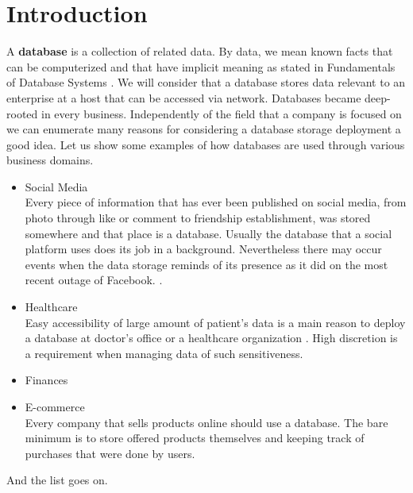 \chapter{Introduction}

\par 
A \textbf{database} is a collection of related data. By data, we mean known facts that can be computerized and that have implicit meaning as stated in Fundamentals of Database Systems \cite{ElmasryNavathe15}. We will consider that a database stores data relevant to an enterprise at a host that can be accessed via network.
Databases became deep-rooted in every business. 
Independently of the field that a company is focused on we can enumerate many reasons for considering a database storage deployment a good idea.
Let us show some examples of how databases are used through various business domains.

\begin{itemize}
	
	\item Social Media \\
	Every piece of information that has ever been published on social media, from photo through like or comment to friendship establishment, was stored somewhere and that place is a database. Usually the database that a social platform uses does its job in a background. Nevertheless there may occur events when the data storage reminds of its presence as it did on the most recent outage of Facebook. \cite{Facebook19}.
	
	\item Healthcare \\
	Easy accessibility of large amount of patient's data is a main reason to deploy a database at doctor's office or a healthcare organization \cite{Healthcare13}. High discretion is a requirement when managing data of such sensitiveness.
	
	\item Finances \\
	
	\item E-commerce \\
	Every company that sells products online should use a database. The bare minimum is to store offered products themselves and keeping track of purchases that were done by users.
	
	
\end{itemize}
And the list goes on.
 \\

